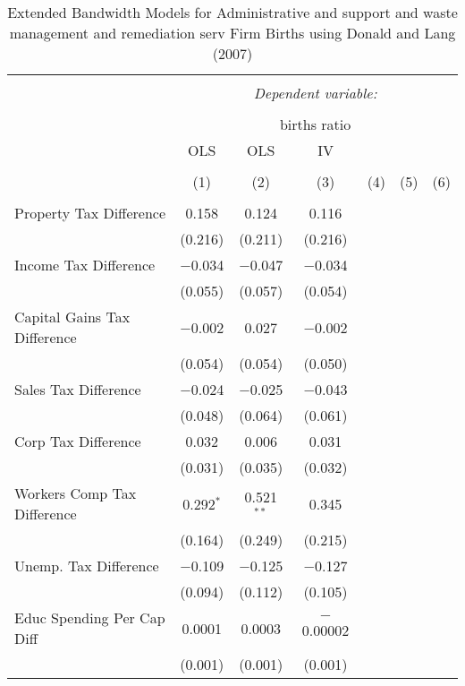 
\begin{table}[!htbp] \centering 
  \caption{Extended Bandwidth Models for  Administrative and support and waste management and remediation serv Firm Births using Donald and Lang (2007)} 
  \label{} 
\begin{tabular}{@{\extracolsep{5pt}}lcccccc} 
\\[-1.8ex]\hline 
\hline \\[-1.8ex] 
 & \multicolumn{6}{c}{\textit{Dependent variable:}} \\ 
\cline{2-7} 
\\[-1.8ex] & \multicolumn{6}{c}{births ratio} \\ 
 & OLS & OLS & IV &  &  &  \\ 
\\[-1.8ex] & (1) & (2) & (3) & (4) & (5) & (6)\\ 
\hline \\[-1.8ex] 
 Property Tax Difference & 0.158 & 0.124 & 0.116 &  &  &  \\ 
  & (0.216) & (0.211) & (0.216) &  &  &  \\ 
  Income Tax Difference & $-$0.034 & $-$0.047 & $-$0.034 &  &  &  \\ 
  & (0.055) & (0.057) & (0.054) &  &  &  \\ 
  Capital Gains Tax Difference & $-$0.002 & 0.027 & $-$0.002 &  &  &  \\ 
  & (0.054) & (0.054) & (0.050) &  &  &  \\ 
  Sales Tax Difference & $-$0.024 & $-$0.025 & $-$0.043 &  &  &  \\ 
  & (0.048) & (0.064) & (0.061) &  &  &  \\ 
  Corp Tax Difference & 0.032 & 0.006 & 0.031 &  &  &  \\ 
  & (0.031) & (0.035) & (0.032) &  &  &  \\ 
  Workers Comp Tax Difference & 0.292$^{*}$ & 0.521$^{**}$ & 0.345 &  &  &  \\ 
  & (0.164) & (0.249) & (0.215) &  &  &  \\ 
  Unemp. Tax Difference & $-$0.109 & $-$0.125 & $-$0.127 &  &  &  \\ 
  & (0.094) & (0.112) & (0.105) &  &  &  \\ 
  Educ Spending Per Cap Diff & 0.0001 & 0.0003 & $-$0.00002 &  &  &  \\ 
  & (0.001) & (0.001) & (0.001) &  &  &  \\ 

\end{tabular}
\end{table}
